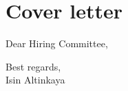 \documentclass[letterpaper,10.5pt]{article}
\newcommand\sbullet[1][.5]{\mathbin{\vcenter{\hbox{\scalebox{#1}{$\bullet$}}}}}
\begin{document}



\section{Cover letter}

\begin{flushleft}
\medskip
Dear Hiring Committee,\\
\vskip 0.2in


\vskip 0.2in
Best regards,\\
Isin Altinkaya

\end{flushleft}
\end{document}
